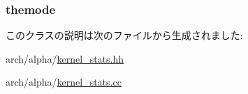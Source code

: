\label{classAlphaISA_1_1Kernel_1_1Statistics_a7982ed5ce2b7a3c40fb9c593629cdaa0}
\hypertarget{classAlphaISA_1_1Kernel_1_1Statistics_ac056a7cd50c440e44bd19d36c746b635}{
\subsubsection[{themode}]{ {\bf themode}}}
\label{classAlphaISA_1_1Kernel_1_1Statistics_ac056a7cd50c440e44bd19d36c746b635}


このクラスの説明は次のファイルから生成されました:\begin{DoxyCompactItemize}
\item 
arch/alpha/\hyperlink{arch_2alpha_2kernel__stats_8hh}{kernel\_\-stats.hh}\item 
arch/alpha/\hyperlink{arch_2alpha_2kernel__stats_8cc}{kernel\_\-stats.cc}\end{DoxyCompactItemize}

